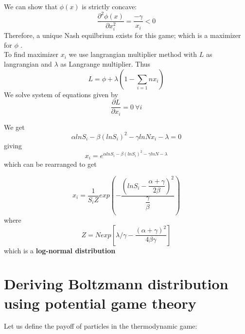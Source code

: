 \documentclass[letterpaper,english,10pt]{article}
\begin{document}
We can show that $\phi(x)$ is strictly concave: 
\begin{equation}
    \dfrac{\partial^2 \phi(x)}{\partial x_i^2}= \dfrac{-\gamma}{x_i}<0
\end{equation}
Therefore, a unique Nash equilbrium exists for this game; which is a maximizer for $\phi$ . \\
To find maximizer $x_i$
we use langrangian multiplier method with $L$ as langrangian and $\lambda$ as Langrange multiplier. Thus 
\begin{equation}
     L=\phi + \lambda(1-\sum_{i=1}{n}x_i)
\end{equation}
We solve system of equations given by
\begin{equation}
     \frac{\partial L}{\partial x_i} =0 ~ \forall i
 \end{equation}
 
 We get 
 \begin{equation}
    \alpha ln S_i-\beta (ln S_i)^2 - \gamma ln Nx_i - \lambda = 0
 \end{equation}
 giving
 \begin{equation}
     x_i = e ^ {\alpha ln S_i - \beta (ln S_i)^2 - \gamma ln N -\lambda}
 \end{equation}
 which can be rearranged to get
 
 \begin{equation}\label{fairpotential}
     x_i = \dfrac{1}{S_i Z}exp(-\dfrac{(lnS_i - \dfrac{\alpha+\gamma}{2\beta})^2 }{\dfrac{\gamma}{\beta}})
 \end{equation}
 where 
 \begin{equation}
     Z = N exp[\lambda/\gamma - \dfrac{(\alpha + \gamma)^2}{4\beta \gamma}]
 \end{equation}
 which is a \textbf{log-normal distribution}
 

\section{Deriving Boltzmann distribution using potential game theory}
Let us define the payoff of particles in the thermodynamic game:
\end{document}
